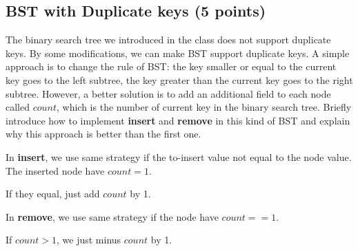 \documentclass[11pt]{exam}
\begin{document}
\subsection{BST with Duplicate keys (5 points)}
The binary search tree we introduced in the class does not support duplicate keys. By some modifications, we can make BST support duplicate keys. A simple approach is to change the rule of BST: the key smaller or equal to the current key goes to the left subtree, the key greater than the current key goes to the right subtree. However, a better solution is to add an additional field to each node called $count$, which is the number of current key in the binary search tree. Briefly introduce how to implement \textbf{insert} and \textbf{remove} in this kind of BST and explain why this approach is better than the first one.

\begin{solution}

    In \textbf{insert}, we use same strategy if the to-insert value not equal to the node value. The inserted node have $count=1$.

    If they equal, just add $count$ by 1.

    In \textbf{remove}, we use same strategy if the node have $count==1$.

    If $count>1$, we just minus $count$ by 1.

\end{solution}
\end{document}
